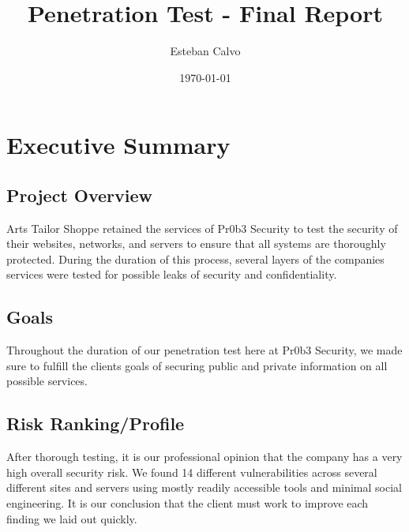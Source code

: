 \documentclass[notitlepage]{article}
\begin{document}
  
\title{Penetration Test - Final Report}
\author{Esteban Calvo}
\date{\isodate\today}

\maketitle

\tableofcontents

\newpage
\section{Executive Summary}



\subsection{Project Overview}

Arts Tailor Shoppe retained the services of Pr0b3 Security to test the security of their websites, networks, and servers to 
ensure that all systems are thoroughly protected. During the duration of this process, several layers
of the companies services were tested for possible leaks of security and confidentiality. 

\subsection{Goals}


Throughout the duration of our penetration test here at Pr0b3 Security, we made sure to fulfill the clients 
goals of securing public and private information on all possible services. 
\subsection{Risk Ranking/Profile}


After thorough testing, it is our professional opinion that the company has a very high overall security risk. We found 14 different
vulnerabilities across several different sites and servers using mostly readily accessible tools and minimal social engineering.
It is our conclusion that the client must work to improve each finding we laid out quickly.  
\end{document}
